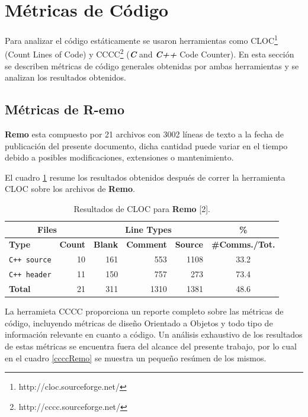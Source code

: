 \section{Métricas de Código}
\par Para analizar el código estáticamente se usaron herramientas como CLOC\footnote{http://cloc.sourceforge.net/} (Count Lines of Code) y CCCC\footnote{http://cccc.sourceforge.net/} (\textbf{\textit{C}} and \textbf{\textit{C++}} Code Counter). En esta sección se describen métricas de código generales obtenidas por ambas herramientas y se analizan los resultados obtenidos.

\subsection{Métricas de R-emo}
\par \textbf{Remo} esta compuesto por 21 archivos con 3002 líneas de texto a la fecha de publicación del presente documento, dicha cantidad puede variar en el tiempo debido a posibles modificaciones, extensiones o mantenimiento.

\par El cuadro \ref{clocRemo} resume los resultados obtenidos después de correr la herramienta CLOC sobre los archivos de \textbf{Remo}.

\begin{table}[!htf]
    \begin{center}
    \begin{tabular}{|l|r|r|r|r|c|}
    \hline
    \multicolumn{2}{|c|}{Files} & \multicolumn{3}{|c|}{Line Types} & \hspace{0.2cm}\% \\
    \hline
    \textbf{Type} & \textbf{Count} & \textbf{Blank} & \textbf{Comment} & \textbf{Source} & \small{\textbf{\#Comms./Tot.}}\\
    \hline
    \texttt{C++ source} & 10 & 161 & 553 & 1108 & 33.2 \\
    \hline
    \texttt{C++ header} & 11 & 150 & 757 & 273 & 73.4 \\
    \hline
    \textbf{Total}      & 21 & 311 & 1310 & 1381 & 48.6 \\
    \hline
    \end{tabular}
    \caption{Resultados de CLOC para \textbf{Remo} [2].}
    \label{clocRemo}
    \end{center}
\end{table}

\par La herramieta CCCC proporciona un reporte completo sobre las métricas de código, incluyendo métricas de diseño Orientado a Objetos y todo tipo de información relevante en cuanto a código. Un análisis exhaustivo de los resultados de estas métricas se encuentra fuera del alcance del presente trabajo, por lo cual en el cuadro \ref{ccccRemo} se muestra un pequeño resúmen de los mismos.

